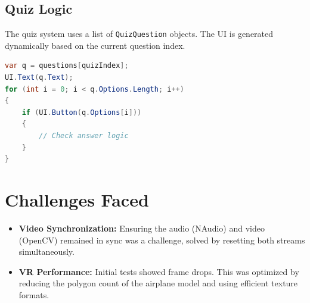 \subsection{Quiz Logic}
The quiz system uses a list of \texttt{QuizQuestion} objects. The UI is generated dynamically based on the current question index.
\begin{lstlisting}[language=C#, caption=Quiz UI Generation]
var q = questions[quizIndex];
UI.Text(q.Text);
for (int i = 0; i < q.Options.Length; i++)
{
    if (UI.Button(q.Options[i]))
    {
        // Check answer logic
    }
}
\end{lstlisting}

\section{Challenges Faced}
\begin{itemize}
    \item \textbf{Video Synchronization:} Ensuring the audio (NAudio) and video (OpenCV) remained in sync was a challenge, solved by resetting both streams simultaneously.
    \item \textbf{VR Performance:} Initial tests showed frame drops. This was optimized by reducing the polygon count of the airplane model and using efficient texture formats.
\end{itemize}
